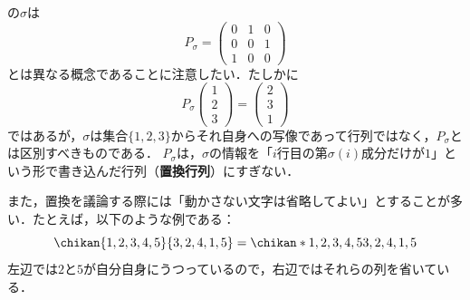 \begin{remark}[置換と置換行列]
  の$\sigma$は
  \[
  P_\sigma = 
  \begin{pmatrix}
    0 & 1 & 0 \\
    0 & 0 & 1\\ 
    1 & 0 & 0 
  \end{pmatrix}
  \]
  とは異なる概念であることに注意したい．たしかに
  \[
   P_\sigma \begin{pmatrix} 1 \\ 2 \\ 3 \end{pmatrix} = \begin{pmatrix} 2 \\ 3\\ 1 \end{pmatrix}
  \]
  ではあるが，$\sigma$は集合$\{1, 2, 3\}$からそれ自身への写像であって行列ではなく，$P_\sigma$とは区別すべきものである．
  $P_\sigma$は，$\sigma$の情報を「$i$行目の第$\sigma(i)$成分だけが$1$」という形で書き込んだ行列（\textbf{置換行列}）にすぎない．
\end{remark}

また，置換を議論する際には「動かさない文字は省略してよい」とすることが多い．たとえば，以下のような例である：
\[
\chikan{1, 2, 3, 4, 5}{3, 2, 4, 1, 5} = \chikan*{1, 2, 3, 4, 5}{3, 2, 4, 1, 5}
\]
左辺では$2$と$5$が自分自身にうつっているので，右辺ではそれらの列を省いている．

